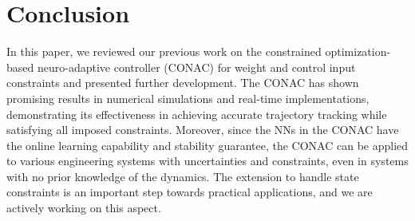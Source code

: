 \documentclass[letterpaper, 10 pt, conference]{ieeeconf}  %
\newcommand*{\template}{template}
\begin{document}
\section{Conclusion} 

In this paper, we reviewed our previous work on the constrained optimization-based neuro-adaptive controller (CONAC) for weight and control input constraints and presented further development.
The CONAC has shown promising results in numerical simulations and real-time implementations, demonstrating its effectiveness in achieving accurate trajectory tracking while satisfying all imposed constraints.
Moreover, since the NNs in the CONAC have the online learning capability and stability guarantee, the CONAC can be applied to various engineering systems with uncertainties and constraints, even in systems with no prior knowledge of the dynamics.
The extension to handle state constraints is an important step towards practical applications, and we are actively working on this aspect.

\addtolength{\textheight}{-12cm}   %













    
    
\end{document}
